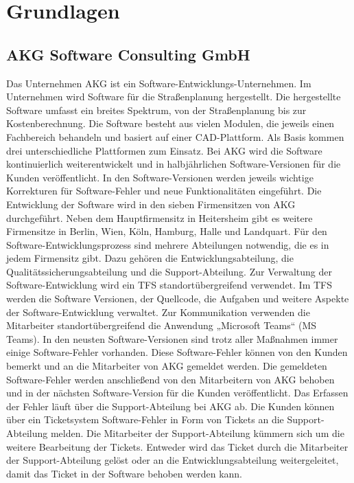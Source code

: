 \section{Grundlagen}

\subsection{AKG Software Consulting GmbH}
Das Unternehmen AKG ist ein Software-Entwicklungs-Unternehmen. Im Unternehmen wird Software für die Straßenplanung hergestellt. Die hergestellte Software umfasst ein breites Spektrum, von der Straßenplanung bis zur Kostenberechnung. Die Software besteht aus vielen Modulen, die jeweils einen Fachbereich behandeln und basiert auf
einer CAD-Plattform. Als Basis kommen drei unterschiedliche Plattformen zum Einsatz. Bei AKG wird die Software kontinuierlich weiterentwickelt und in halbjährlichen
Software-Versionen für die Kunden veröffentlicht. In den Software-Versionen werden jeweils wichtige Korrekturen für Software-Fehler und neue Funktionalitäten eingeführt. Die Entwicklung der Software wird in den sieben Firmensitzen von AKG durchgeführt. Neben dem Hauptfirmensitz in Heitersheim gibt es weitere Firmensitze in Berlin, Wien, Köln, Hamburg, Halle und Landquart. Für den Software-Entwicklungsprozess sind mehrere Abteilungen notwendig, die es in jedem Firmensitz gibt. Dazu gehören die Entwicklungsabteilung, die Qualitätssicherungsabteilung und die Support-Abteilung. Zur Verwaltung der Software-Entwicklung wird ein \ac{TFS} standortübergreifend verwendet. Im \ac{TFS} werden die Software Versionen, der Quellcode, die Aufgaben und weitere Aspekte der Software-Entwicklung verwaltet. Zur Kommunikation verwenden die Mitarbeiter standortübergreifend die Anwendung „Microsoft Teams“ (MS Teams). In den neusten Software-Versionen sind trotz aller Maßnahmen immer einige Software-Fehler vorhanden. Diese Software-Fehler können von den Kunden bemerkt und an die Mitarbeiter von AKG gemeldet werden. Die gemeldeten Software-Fehler werden anschließend von den Mitarbeitern von AKG behoben und in der nächsten Software-Version für die Kunden veröffentlicht. Das Erfassen der Fehler läuft über die Support-Abteilung bei AKG ab. Die Kunden können über ein Ticketsystem Software-Fehler in Form von Tickets an die Support-Abteilung melden. Die Mitarbeiter der Support-Abteilung kümmern sich um die weitere Bearbeitung der Tickets. Entweder wird das Ticket durch die Mitarbeiter der Support-Abteilung gelöst oder an die Entwicklungsabteilung weitergeleitet, damit das Ticket in der Software behoben werden kann.

